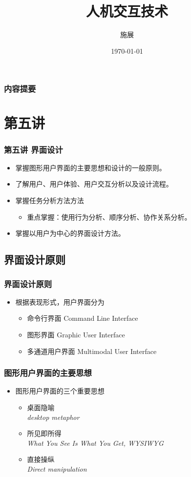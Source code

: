 \documentclass{beamer}
\title{人机交互技术}
\author{施展}
\institute{华中科技大学~武汉光电国家实验室}
\date{\today}
\begin{document}
\begin{frame}
	\titlepage
\end{frame}

\begin{frame}
	\frametitle{内容提要}
	\tableofcontents
\end{frame}

\section{第五讲}
\begin{frame}
	\frametitle{第五讲 界面设计}
	\begin{itemize}
		\item 掌握图形用户界面的主要思想和设计的一般原则。
		\item 了解用户、用户体验、用户交互分析以及设计流程。
		\item 掌握任务分析方法方法
		\begin{itemize}
			\item 重点掌握：使用行为分析、顺序分析、协作关系分析。
		\end{itemize}
		\item 掌握以用户为中心的界面设计方法。
	\end{itemize}
\end{frame}

\subsection{界面设计原则}
\begin{frame}
	\frametitle{界面设计原则}
	\begin{itemize}
		\item 根据表现形式，用户界面分为
		\begin{itemize}
			\item 命令行界面 Command Line Interface
			\item 图形界面 Graphic User Interface
			\item 多通道用户界面 Multimodal User Interface
		\end{itemize}
	\end{itemize}
\end{frame}

\begin{frame}
	\frametitle{图形用户界面的主要思想}
	\begin{itemize}
		\item 图形用户界面的三个重要思想
		\begin{itemize}
			\item 桌面隐喻\\\textit{desktop metaphor}
			\item 所见即所得\\\textit{What You See Is What You Get, WYSIWYG}
			\item 直接操纵\\\textit{Direct manipulation}
		\end{itemize}
	\end{itemize}
\end{frame}
\end{document}
